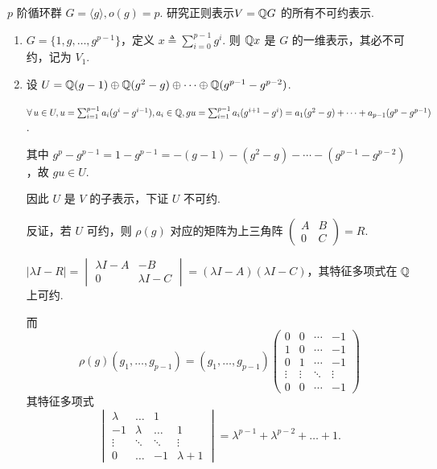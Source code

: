 \begin{instance}
    $p$ 阶循环群 $G = \langle g \rangle, o(g) = p$. 研究正则表示$V=\mathbb{Q}G$ 的所有不可约表示.
    \begin{enumerate}[label=(\arabic*)]
        \item $G = \{1, g, \dots, g^{p-1}\}$，定义 $x \triangleq \sum_{i=0}^{p-1} g^i$. 则 $\mathbb{Q}x$ 是 $G$ 的一维表示，其必不可约，记为 $V_1$.
        \item 设 $U = \mathbb{Q}(g-1) \oplus \mathbb{Q}(g^2-g) \oplus \cdots \oplus \mathbb{Q}(g^{p-1}-g^{p-2})$.\par
        $\forall\, u \in U, u = \sum_{i=1}^{p-1} a_i(g^i - g^{i-1}), a_i \in \mathbb{Q}, gu = \sum_{i=1}^{p-1} a_i(g^{i+1} - g^i) = a_1(g^2-g) + \cdots + a_{p-1}(g^p-g^{p-1})$.\par
        其中 $g^p-g^{p-1} = 1-g^{p-1} = -(g-1)-(g^2-g)-\cdots-(g^{p-1}-g^{p-2})$，故 $gu \in U$.\par
        因此 $U$ 是 $V$ 的子表示，下证 $U$ 不可约.\par
        反证，若 $U$ 可约，则 $\rho(g)$ 对应的矩阵为上三角阵 $\begin{pmatrix} A & B \\ 0 & C \end{pmatrix} = R$.\par
        $|\lambda I - R| = \begin{vmatrix} \lambda I - A & -B \\ 0 & \lambda I - C \end{vmatrix} = (\lambda I - A)(\lambda I - C)$，其特征多项式在 $\mathbb{Q}$ 上可约.\par
        而 \begin{equation*}
        \rho(g)(g_1, \dots, g_{p-1}) = (g_1, \dots, g_{p-1}) \begin{pmatrix} 0 & 0 & \cdots & -1 \\ 1 & 0 & \cdots & -1 \\ 0 & 1 & \cdots & -1 \\ \vdots & \vdots & \ddots & \vdots \\ 0 & 0 & \cdots & -1 \end{pmatrix}
        \end{equation*}
        其特征多项式 \begin{equation*}\begin{vmatrix} \lambda & \dots & 1 \\ -1 & \lambda & \dots & 1 \\ \vdots & \ddots & \ddots & \vdots \\ 0 & \dots & -1 & \lambda+1 \end{vmatrix} = \lambda^{p-1} + \lambda^{p-2} + \dots + 1.

\end{equation*}
\end{enumerate}
\end{instance}
